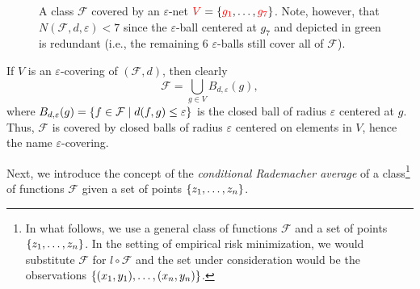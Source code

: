 \begin{figure}
    \centering
    \caption{%
         A class $\mathcal{F}$ covered by an $\varepsilon$-net ${\color{red} V} = \left\{{\color{red} g_1}, \dots, {\color{red} g_7}\right\}$. Note, however, that $N(\mathcal{F}, d, \varepsilon) < 7$ since the $\varepsilon$-ball centered at $g_7$ and depicted in green is redundant (i.e., the remaining 6 $\varepsilon$-balls still cover all of $\mathcal{F}$).
    }
    \label{fig: epsilon-net}
\end{figure}

If $V$ is an $\varepsilon$-covering of $(\mathcal{F}, d)$, then clearly
\[
    \mathcal{F} = \bigcup_{g \in V} B_{d, \varepsilon}(g),
\]
where $B_{d, \varepsilon}(g) = \left\{f \in \mathcal{F} \mathrel{|} d(f, g) \leq \varepsilon\right\}$ is the closed ball of radius $\varepsilon$ centered at $g$. Thus, $\mathcal{F}$ is covered by closed balls of radius $\varepsilon$ centered on elements in $V$, hence the name $\varepsilon$-covering.

Next, we introduce the concept of the \emph{conditional Rademacher average} of a class\footnote{In what follows, we use a general class of functions $\mathcal{F}$ and a set of points $\left\{z_1, \dots, z_n\right\}$. In the setting of empirical risk minimization, we would substitute $\mathcal{F}$ for $l \circ \mathcal{F}$ and the set under consideration would be the observations $\left\{(x_1, y_1), \dots, (x_n, y_n)\right\}$.} of functions $\mathcal{F}$ given a set of points $\left\{z_1, \dots, z_n\right\}$.

